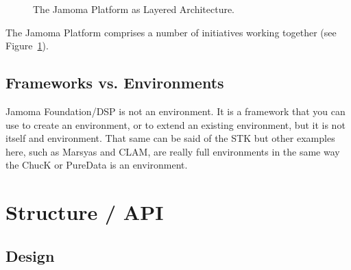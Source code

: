 \documentclass[twoside,10pt]{article}
\begin{document}
\begin{figure}[htbp]
\centerline{}
\caption{The Jamoma Platform as Layered Architecture.}
\label{fig:layers}
\end{figure}

The Jamoma Platform comprises a number of initiatives working together
(see Figure~\ref{fig:layers}).



\subsection {Frameworks vs. Environments}


Jamoma Foundation/DSP is not an environment.  It is a framework that you can use to create an environment, or to extend an existing environment, but it is not itself and environment.  That same can be said of the STK but other examples here, such as Marsyas and CLAM, are really full environments in the same way the ChucK or PureData is an environment.





\section{Structure / API} %

\subsection{Design}
\end{document}
